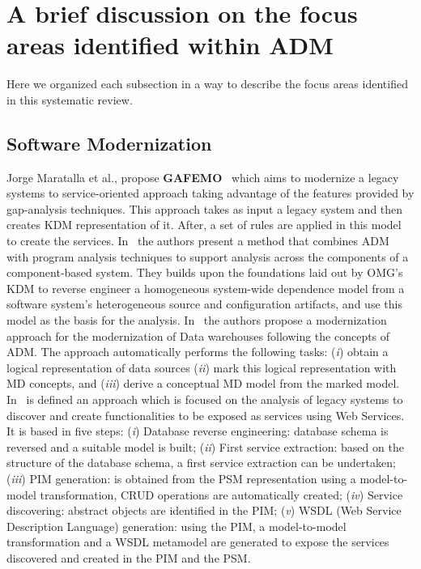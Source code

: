 \section{A brief discussion on the focus areas identified within ADM}

Here we organized each subsection in a way to describe the focus areas identified in this systematic review.

\subsection{Software Modernization} %
\label{ssub:approach}

 Jorge Maratalla et al., propose \textbf{GAFEMO}~\cite{6311013} which aims to modernize a legacy systems to service-oriented approach taking advantage of the features provided by gap-analysis techniques. This approach takes as input a legacy system and then creates KDM representation of it. After, a set of rules are applied in this model to create the services. In~\cite{6080786} the authors present a method that combines ADM with program analysis techniques to support analysis across the components of a component-based system. They builds upon the foundations laid out by OMG's KDM to reverse engineer a homogeneous system-wide dependence model from a software system's heterogeneous source and configuration artifacts, and use this model as the basis for the analysis. In~\cite{Mazon:2007:MDM:1784489.1784497} the authors propose a modernization approach for the modernization of Data warehouses following the concepts of ADM. The approach automatically performs the following tasks: (\textit{i}) obtain a logical representation of data sources (\textit{ii}) mark this logical representation with MD concepts, and (\textit{iii}) derive a conceptual MD model from the marked model. In~\cite{Guzman:2007:AAR:1339262.1339532} is defined an approach which is focused on the analysis of legacy systems to discover and create functionalities to be exposed as services using Web Services. It is based in five steps: (\textit{i}) Database reverse engineering: database schema is reversed and a suitable model is built; (\textit{ii}) First service extraction: based on the structure of the database schema, a first service extraction can be undertaken; (\textit{iii}) PIM generation: is obtained from the PSM representation using a model-to-model transformation, CRUD operations are automatically created; (\textit{iv}) Service discovering: abstract objects are identified in the PIM; (\textit{v}) WSDL (Web Service Description Language) generation: using the PIM, a model-to-model transformation and a WSDL  metamodel are generated to expose the services discovered and created in the PIM and the PSM. 

